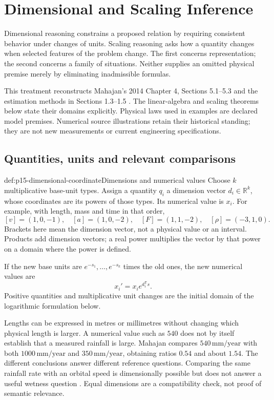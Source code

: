 \chapter{Dimensional and Scaling Inference}
\label{sec:p15-dimensional-and-scaling-inference}

Dimensional reasoning constrains a proposed relation by requiring consistent
behavior under changes of units. Scaling reasoning asks how a quantity changes
when selected features of the problem change. The first concerns representation;
the second concerns a family of situations. Neither supplies an omitted
physical premise merely by eliminating inadmissible formulas.

This treatment reconstructs Mahajan's 2014 Chapter 4, Sections 5.1--5.3 and
the estimation methods in Sections 1.3--1.5 \cite{Mahajan2014Insight}.
The linear-algebra and scaling theorems below state their domains explicitly.
Physical laws used in examples are declared model premises. Numerical source
illustrations retain their historical standing; they are not new measurements
or current engineering specifications.

\section{Quantities, units and relevant comparisons}
\label{sec:p15-dimensional-quantities}

\begin{hbdefinition}{def:p15-dimensional-coordinate}{Dimensions and numerical values}
Choose \(k\) multiplicative base-unit types. Assign a quantity \(q_i\) a
dimension vector \(d_i\in\mathbb R^k\), whose coordinates are its powers
of those types. Its numerical value is \(x_i\).
For example, with length, mass and time in that order,
\[
 [v]=(1,0,-1),\quad [a]=(1,0,-2),\quad
 [F]=(1,1,-2),\quad [\rho]=(-3,1,0).
\]
Brackets here mean the dimension vector, not a physical value or an interval.
Products add dimension vectors; a real power multiplies the vector by that
power on a domain where the power is defined.

If the new base units are \(e^{-s_1},\ldots,e^{-s_k}\) times the old ones,
the new numerical values are
\[
 x_i'=x_i e^{d_i^{\mathsf T}s}.
\]
Positive quantities and multiplicative unit changes are the initial domain
of the logarithmic formulation below.
\end{hbdefinition}

Lengths can be expressed in metres or millimetres without changing which
physical length is larger. A numerical value such as \(540\) does not by
itself establish that a measured rainfall is large. Mahajan compares
\(540\,\mathrm{mm/year}\) with both \(1000\,\mathrm{mm/year}\) and
\(350\,\mathrm{mm/year}\), obtaining ratios \(0.54\) and about \(1.54\).
The different conclusions answer different reference questions.
Comparing the same rainfall rate with an orbital speed is dimensionally
possible but does not answer a useful wetness question
\cite[pp.~137--138]{Mahajan2014Insight}. Equal dimensions are a compatibility
check, not proof of semantic relevance.

